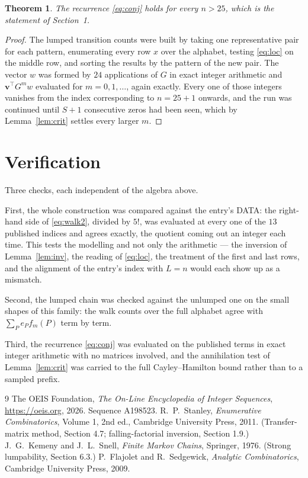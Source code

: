 \documentclass[11pt,a4paper]{article}
\theoremstyle{plain}
\newtheorem{theorem}{Theorem}
\theoremstyle{definition}
\begin{document}
\begin{theorem}
The recurrence \eqref{eq:conj} holds for every $n>25$, which is the statement of
Section~1.
\end{theorem}

\begin{proof}
The lumped transition counts were built by taking one representative pair for each pattern,
enumerating every row $x$ over the alphabet, testing \eqref{eq:loc} on the middle
row, and sorting the results by the pattern of the new pair. The vector $w$ was formed by
$24$ applications of $G$ in exact integer arithmetic and $\mathbf{v}^{\!\top}G^{m}w$
evaluated for $m=0,1,\dots$, again exactly. Every one of those integers vanishes from the
index corresponding to $n=25+1$ onwards, and the run was continued until $S+1$
consecutive zeros had been seen, which by Lemma~\ref{lem:crit} settles every larger $m$.
\end{proof}

\section{Verification}

Three checks, each independent of the algebra above.

First, the whole construction was compared against the entry's DATA: the right-hand side of
\eqref{eq:walk2}, divided by $5!$, was evaluated at every one of the $13$
published indices and agrees exactly, the quotient coming out an integer each time. This
tests the modelling and not only the arithmetic --- the inversion of Lemma~\ref{lem:inv},
the reading of \eqref{eq:loc}, the treatment of the first and last rows, and the
alignment of the entry's index with $L=n$ would each show up as a mismatch.

Second, the lumped chain was checked against the unlumped one on the small shapes of this
family: the walk counts over the full alphabet agree with $\sum_P e_Pf_m(P)$ term by term.

Third, the recurrence \eqref{eq:conj} was evaluated on the published terms in exact integer
arithmetic with no matrices involved, and the annihilation test of Lemma~\ref{lem:crit} was
carried to the full Cayley--Hamilton bound rather than to a sampled prefix.

\begin{thebibliography}{9}
 The OEIS Foundation, \emph{The On-Line Encyclopedia of Integer
Sequences}, \url{https://oeis.org}, 2026. Sequence A198523.
 R.~P.~Stanley, \emph{Enumerative Combinatorics}, Volume 1, 2nd ed.,
Cambridge University Press, 2011. (Transfer-matrix method, Section 4.7; falling-factorial
inversion, Section 1.9.)
 J.~G.~Kemeny and J.~L.~Snell, \emph{Finite Markov Chains}, Springer,
1976. (Strong lumpability, Section 6.3.)
 P.~Flajolet and R.~Sedgewick, \emph{Analytic Combinatorics}, Cambridge
University Press, 2009.
\end{thebibliography}
\end{document}
